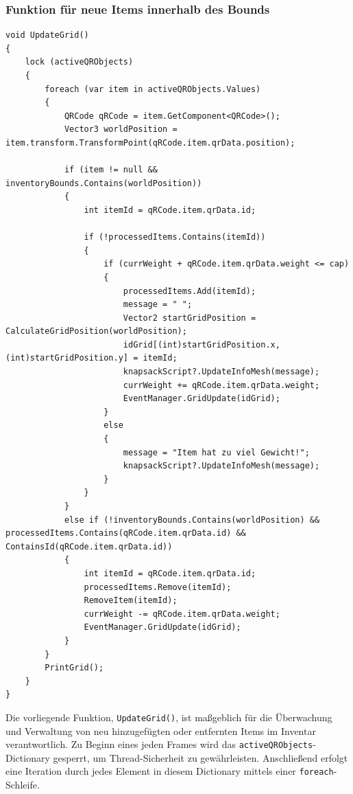 \subsubsection{Funktion für neue Items innerhalb des Bounds}
\begin{lstlisting}[style=csharp, caption={Code fuer ueberpruefen neuer Items im Inventar}, label=code:controller_check]
void UpdateGrid()
{
    lock (activeQRObjects)
    {
        foreach (var item in activeQRObjects.Values)
        {
            QRCode qRCode = item.GetComponent<QRCode>();
            Vector3 worldPosition = item.transform.TransformPoint(qRCode.item.qrData.position);

            if (item != null && inventoryBounds.Contains(worldPosition))
            {
                int itemId = qRCode.item.qrData.id;

                if (!processedItems.Contains(itemId))
                {
                    if (currWeight + qRCode.item.qrData.weight <= cap)
                    {
                        processedItems.Add(itemId);
                        message = " ";
                        Vector2 startGridPosition = CalculateGridPosition(worldPosition);
                        idGrid[(int)startGridPosition.x, (int)startGridPosition.y] = itemId;
                        knapsackScript?.UpdateInfoMesh(message);
                        currWeight += qRCode.item.qrData.weight;
                        EventManager.GridUpdate(idGrid);
                    }
                    else
                    {
                        message = "Item hat zu viel Gewicht!";
                        knapsackScript?.UpdateInfoMesh(message);
                    }
                }
            }
            else if (!inventoryBounds.Contains(worldPosition) && processedItems.Contains(qRCode.item.qrData.id) && ContainsId(qRCode.item.qrData.id))
            {
                int itemId = qRCode.item.qrData.id;
                processedItems.Remove(itemId);
                RemoveItem(itemId);
                currWeight -= qRCode.item.qrData.weight;
                EventManager.GridUpdate(idGrid);
            }
        }
        PrintGrid();
    }
}
\end{lstlisting}
Die vorliegende Funktion, \texttt{UpdateGrid()}, ist maßgeblich für die Überwachung und Verwaltung von neu hinzugefügten
oder entfernten Items im Inventar verantwortlich. Zu Beginn eines jeden Frames wird das \texttt{activeQRObjects}-Dictionary
gesperrt, um Thread-Sicherheit zu gewährleisten. Anschließend erfolgt eine Iteration durch jedes Element in diesem Dictionary
mittels einer \texttt{foreach}-Schleife.\\

